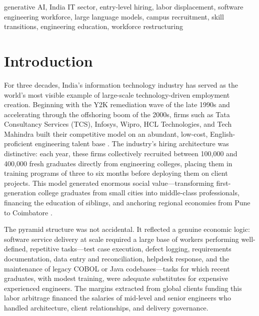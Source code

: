\documentclass[conference]{IEEEtran}
\begin{document}
\begin{IEEEkeywords}
generative AI, India IT sector, entry-level hiring, labor displacement, software engineering workforce, large language models, campus recruitment, skill transitions, engineering education, workforce restructuring
\end{IEEEkeywords}

\section{Introduction}

For three decades, India's information technology industry has served as the world's most visible example of large-scale technology-driven employment creation. Beginning with the Y2K remediation wave of the late 1990s and accelerating through the offshoring boom of the 2000s, firms such as Tata Consultancy Services (TCS), Infosys, Wipro, HCL Technologies, and Tech Mahindra built their competitive model on an abundant, low-cost, English-proficient engineering talent base \cite{arora2008india}. The industry's hiring architecture was distinctive: each year, these firms collectively recruited between 100,000 and 400,000 fresh graduates directly from engineering colleges, placing them in training programs of three to six months before deploying them on client projects. This model generated enormous social value---transforming first-generation college graduates from small cities into middle-class professionals, financing the education of siblings, and anchoring regional economies from Pune to Coimbatore \cite{upadhya2007software}.

The pyramid structure was not accidental. It reflected a genuine economic logic: software service delivery at scale required a large base of workers performing well-defined, repetitive tasks---test case execution, defect logging, requirements documentation, data entry and reconciliation, helpdesk response, and the maintenance of legacy COBOL or Java codebases---tasks for which recent graduates, with modest training, were adequate substitutes for expensive experienced engineers. The margins extracted from global clients funding this labor arbitrage financed the salaries of mid-level and senior engineers who handled architecture, client relationships, and delivery governance.
\end{document}
